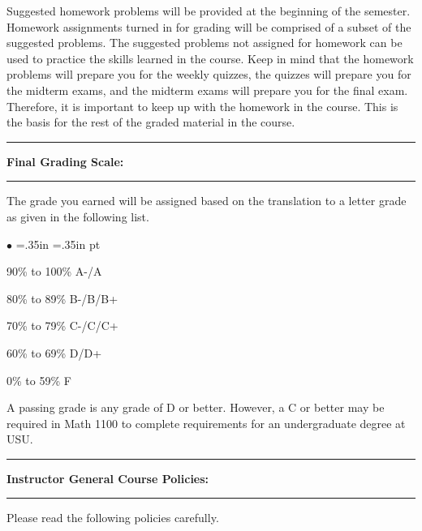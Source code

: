 \documentclass[10pt,fleqn]{article}
\begin{document}
\noindent
Suggested homework problems will be provided at the beginning of the semester.
Homework assignments turned in for grading will be comprised of a subset of the
suggested problems. The suggested problems not assigned for homework can be used
to practice the skills learned in the course. Keep in mind that the homework
problems will prepare you for the weekly quizzes, the quizzes will prepare you
for the midterm exams, and the midterm exams will prepare you for the final
exam. Therefore, it is important to keep up with the homework in the course.
This is the basis for the rest of the graded material in the course.
\vskip0.1in\hrule\vskip0.1in
\noindent
{\bf Final Grading Scale:}
\vskip0.1in\hrule\vskip0.1in
\noindent
The grade you earned will be assigned based on the translation to a letter grade
as given in the following list.
\begin{list}{$\bullet$}{ \parsep=0pt \listparindent=0pt
\topsep=0pt \rightmargin=.35in \leftmargin=.35in   pt \itemsep=2pt}
  \item 90\% to 100\% A-/A
  \item 80\% to 89\% B-/B/B+
  \item 70\% to 79\% C-/C/C+
  \item 60\% to 69\% D/D+
  \item 0\% to 59\% F
\end{list}
A passing grade is any grade of D or better. However, a C or better may be
required in Math 1100 to complete requirements for an undergraduate degree at
USU.
\vskip0.1in\hrule\vskip0.1in
\noindent
{\bf Instructor General Course Policies:}
\vskip0.1in\hrule\vskip0.1in\noindent
Please read the following policies carefully.
\noindent
\end{document}
